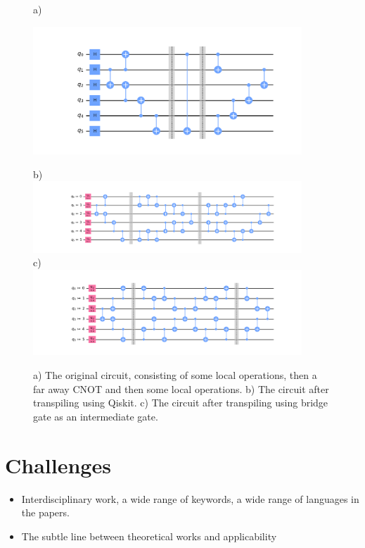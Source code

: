 \documentclass{article}
\begin{document}
  \begin{figure}
    a) \\
    \begin{center}
    \includegraphics[width=0.9\textwidth]{../../code/expm_1_bridge/out/original_circuit}
    \end{center}
    b) \\
    \includegraphics[width=0.9\textwidth]{../../code/expm_1_bridge/out/transpiled_circuit_swap} \\
    c) \\
    \includegraphics[width=0.9\textwidth]{../../code/expm_1_bridge/out/transpiled_circuit_bridge}
    \caption{a) The original circuit, consisting of some local operations, then a far away CNOT and then some local operations. b) The circuit after transpiling using Qiskit. c) The circuit after transpiling using bridge gate as an intermediate gate.}
  \end{figure}

\section{Challenges}

\begin{itemize}
\item Interdisciplinary work, a wide range of keywords, a wide range of languages in the papers.

\item The subtle line between theoretical works and applicability
\end{itemize}
\end{document}
